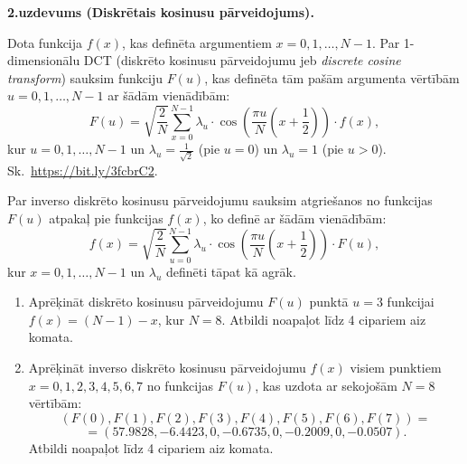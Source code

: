 \documentclass[a4paper,12pt]{article}
\begin{document}
\vspace{10pt}
{\bf 2.uzdevums (Diskrētais kosinusu pārveidojums).}

Dota funkcija $f(x)$, kas definēta argumentiem $x=0,1,\ldots,N-1$. 
Par 1-dimensionālu DCT (diskrēto kosinusu pārveidojumu jeb {\em discrete cosine transform}) sauksim 
funkciju $F(u)$, kas definēta tām pašām argumenta vērtībām $u=0,1,\ldots,N-1$ 
ar šādām vienādībām: 
$$F(u) = \sqrt{\frac{2}{N}} \sum\limits_{x=0}^{N-1} \lambda_u \cdot \cos \left( \frac{\pi u}{N}\left(  x+\frac{1}{2} \right) \right) \cdot f(x),$$
kur $u=0,1,\ldots,N-1$ un $\lambda_u = \frac{1}{\sqrt{2}}$ (pie $u=0$) un $\lambda_u = 1$ (pie $u>0$).\\
Sk.\ \url{https://bit.ly/3fcbrC2}.

Par inverso diskrēto kosinusu pārveidojumu sauksim atgriešanos no funkcijas $F(u)$ atpakaļ pie funkcijas $f(x)$, 
ko definē ar šādām vienādībām:
$$f(x) = \sqrt{\frac{2}{N}} \sum\limits_{u=0}^{N-1} \lambda_u \cdot \cos \left( \frac{\pi u}{N}\left(  x+\frac{1}{2} \right) \right) \cdot F(u),$$
kur $x=0,1,\ldots,N-1$ un $\lambda_u$ definēti tāpat kā agrāk.
\begin{enumerate}
\item 
Aprēķināt diskrēto kosinusu pārveidojumu $F(u)$ punktā $u=3$
funkcijai\\ $f(x) = (N-1)-x$, kur $N=8$. 
Atbildi noapaļot līdz 4 cipariem aiz komata.
\item 
Aprēķināt inverso diskrēto kosinusu pārveidojumu $f(x)$ visiem 
punktiem $x=0,1,2,3,4,5,6,7$ no funkcijas $F(u)$, kas uzdota ar
sekojošām $N=8$ vērtībām:
$$(F(0),F(1),F(2),F(3),F(4),F(5),F(6),F(7)) =$$
$$ = (57.9828,-6.4423,0,-0.6735,0,-0.2009,0,-0.0507).$$
Atbildi noapaļot līdz 4 cipariem aiz komata.
\end{enumerate}
\end{document}
